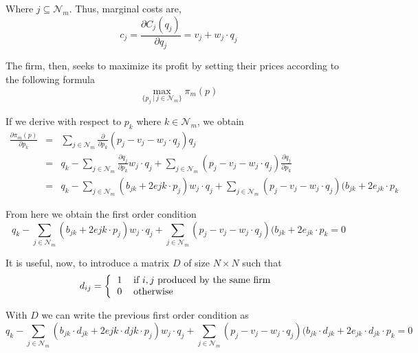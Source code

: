 \documentclass[12pt]{article}
\begin{document}
Where $j \subseteq \mathcal{N}_m$. Thus, marginal costs are,
\begin{equation*}
c_j = \frac{\partial C_j(q_j)}{\partial q_j}= v_j + w_j \cdot q_j
\end{equation*}

The firm, then, seeks to maximize its profit by setting their prices according to the following formula
\begin{equation*}
\max_{\{p_j ~ | ~ j \in \mathcal{N}_m\}} \pi_m(p)
\end{equation*}

If we derive with respect to $p_k$ where $k \in \mathcal{N}_m$, we obtain
\begin{eqnarray*}
\frac{\partial \pi_m(p)}{\partial p_k} &=& \sum_{j \in \mathcal{N}_m} \frac{\partial}{\partial p_k} (p_j - v_j - w_j \cdot q_j) q_j\\
&=& q_k - \sum_{j \in \mathcal{N}_m} \frac{\partial q_j}{\partial p_k} w_j \cdot q_j + \sum_{j \in \mathcal{N}_m} (p_j - v_j - w_j \cdot q_j) \frac{\partial q_j}{\partial p_k}\\
&=& q_k - \sum_{j \in \mathcal{N}_m} (b_{jk} + 2e{jk} \cdot p_j) w_j \cdot q_j + \sum_{j \in \mathcal{N}_m} (p_j - v_j - w_j \cdot q_j)(b_{jk} + 2e_{jk} \cdot p_k
\end{eqnarray*}

From here we obtain the first order condition
\begin{equation*}
q_k - \sum_{j \in \mathcal{N}_m} (b_{jk} + 2e{jk} \cdot p_j) w_j \cdot q_j + \sum_{j \in \mathcal{N}_m} (p_j - v_j - w_j \cdot q_j)(b_{jk} + 2e_{jk} \cdot p_k = 0
\end{equation*}

It is useful, now, to introduce a matrix $D$ of size $N \times N$ such that 
\begin{equation*}
d_{ij} = \left\{
\begin{tabular}{ll}
1 & if $i,j$ produced by the same firm\\
0 & otherwise
\end{tabular}\right.
\end{equation*}

With $D$ we can write the previous first order condition as
\begin{equation*}
q_k - \sum_{j \in \mathcal{N}_m} (b_{jk} \cdot d_{jk} + 2e{jk} \cdot d{jk} \cdot p_j) w_j \cdot q_j + \sum_{j \in \mathcal{N}_m} (p_j - v_j - w_j \cdot q_j)(b_{jk} \cdot d_{jk} + 2e_{jk} \cdot d_{jk} \cdot p_k = 0
\end{equation*}
\end{document}
